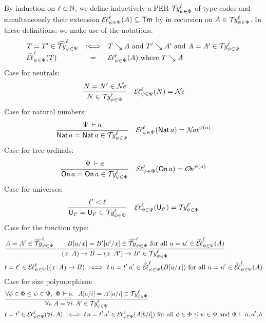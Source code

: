 \documentclass[acmsmall,screen]{acmart}\settopmatter{}
\renewcommand{\forallT}[2]{\forall #1.\,#2}
\begin{document}
By induction on $\ell \in \mathbb{N}$, we define inductively a PER
$\mathcal{T}\kern-0.4ex\mathit{y}^{\ell}_{\psi\in\Psi}$ of type codes and simultaneously their extension
$\mathcal{E}\kern-0.2ex\ell^{\ell}_{\psi\in\Psi}(A) \subseteq \mathsf{Tm}$ by in recursion on
$A \in \mathcal{T}\kern-0.4ex\mathit{y}^{\ell}_{\psi\in\Psi}$.
In these definitions, we make use of the notations:
\[
\begin{array}{lcl}
  T = T' \in \widehat{\mathcal{T}\kern-0.4ex\mathit{y}}^{\ell}_{\psi\in\Psi}
    & \mathrel{:\Longleftrightarrow} & T \searrow A \ \mbox{and}\  T' \searrow A' \ \mbox{and}\  A = A' \in \mathcal{T}\kern-0.4ex\mathit{y}^{\ell}_{\psi\in\Psi}
\\
  \widehat{\mathcal{E}\kern-0.2ex\ell}^{\ell}_{\psi\in\Psi}(T)
    & = & \mathcal{E}\kern-0.2ex\ell^{\ell}_{\psi\in\Psi}(A) \ \mbox{where}\  T \searrow A
\end{array}
\]
Case for neutrals:
\begin{align*}
  & \ru{N = N' \in \NE}{N \in \TY \Psi \psi \ell}
  &
  \EL \Psi \psi \ell N = \NE
\end{align*}
Case for natural numbers:
\begin{align*}
  & \ru{\Psi \der a
      }{\Nat a = \Nat a \in \TY \Psi \psi \ell}
  & \EL \Psi \psi \ell {\Nat a}
    = \NAT^{\psi(a)}
\end{align*}
Case for tree ordinals:
\begin{align*}
  & \ru{\Psi \der a
      }{\On a = \On a \in \TY \Psi \psi \ell}
  & \EL \Psi \psi \ell {\On a}
    = \ON^{\psi(a)}
\end{align*}
Case for universes:
\begin{align*}
  & \ru{\ell' < \ell
      }{\Univ{\ell'} = \Univ{\ell'} \in \TY \Psi \psi \ell}
  & \EL \Psi \psi \ell{\Univ{\ell'}}
    =
    \TY \Psi \psi {\ell'}
\end{align*}
Case for the function type:
\begin{align*}
  & \ru{A = A' \in \TYhat \Psi \psi \ell \qquad
        \subst u x B = \subst{u'}x{B'} \in \TYhat \Psi \psi \ell
        \mforall u = u' \in \ELhat \Psi \psi \ell A
      }{\funT x A B = \funT x {A'} {B'} \in \TY \Psi \psi \ell}
\\
  & t = t' \in \EL \Psi \psi \ell {\funT x A B}
    \defas
    t\,u = t'\,u' \in \ELhat \Psi \psi \ell {\subst u x B}
    \mforall u = u' \in \ELhat \Psi \psi \ell A
\\
\end{align*}
Case for size polymorphism:
\begin{align*}
  & \ru{\forall \phi \in \Phi \leq \psi \in \Psi,\
        \Phi \der a.\ \
        \subst a i A = \subst a i {A'} \in \TY \Phi \phi \ell
      }{\forallT i A = \forallT i {A'} \in \TY \Psi \psi \ell}
\\
  & t = t' \in \EL \Psi \psi \ell {\forallT i A}
    \defas
    t\,a = t'\,a' \in \EL \Phi \phi \ell {\subst b i A}
    \mforall \phi \in \Phi \leq \psi \in \Psi
    \mand \Phi \der a,a',b
\end{align*}








\end{document}
